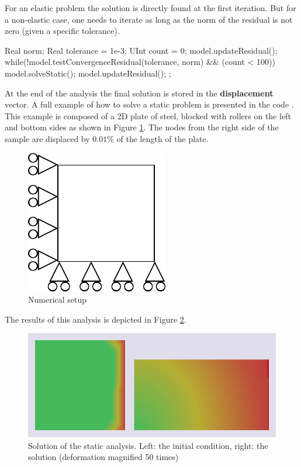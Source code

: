 For  an   elastic  problem  the  solution   is  directly  found   at  the  first
iteration. But for a non-elastic case, one  needs to iterate as long as the norm
of the residual is not zero (given a specific tolerance).
\begin{cpp}
  Real norm;
  Real tolerance = 1e-3;
  UInt count = 0;
  model.updateResidual();
  while(!model.testConvergenceResidual(tolerance, norm) && (count < 100)) {
    model.solveStatic();
    model.updateResidual();
  };
\end{cpp}

At   the  end   of  the   analysis  the   final  solution   is  stored   in  the
\textbf{displacement} vector.  A  full example of how to  solve a static problem
is  presented  in   the  code  .   This
example is composed of a 2D plate of steel, blocked with rollers on the left and
bottom sides as shown in  Figure \ref{fig:smm:static}.  The nodes from the right
side of the sample are displaced by $0.01\%$ of the length of the plate.

\begin{figure}[!htb]
  \centering
  \includegraphics{figures/implicit_static}
  \caption{Numerical setup\label{fig:smm:static}}
\end{figure}

The     results     of    this     analysis     is     depicted    in     Figure
\ref{fig:smm:implicit:static_solution}.

\begin{figure}[!htb]
  \centering
  \includegraphics[width=.6\linewidth]{figures/static_analysis}
  \caption{Solution of the static  analysis. Left: the initial condition, right:
    the solution (deformation magnified 50 times)}
  \label{fig:smm:implicit:static_solution}
\end{figure}





